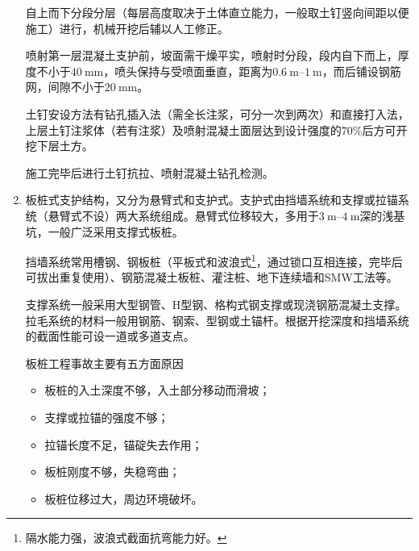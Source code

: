 \documentclass{book}
\begin{document}
\begin{enumerate}
\begin{figure*}[htbp]
\begin{center}
              \end{center}
          \end{figure*}
          \par 自上而下分段分层（每层高度取决于土体直立能力，一般取土钉竖向间距以便施工）进行，机械开挖后辅以人工修正。
          \par 喷射第一层混凝土支护前，坡面需干燥平实，喷射时分段，段内自下而上，厚度不小于$\SI{40}{\mm}$，喷头保持与受喷面垂直，距离为$\SIrange{0.6}{1}{\m}$，而后铺设钢筋网，间隙不小于$\SI{20}{\mm}$。
          \par 土钉安设方法有钻孔插入法（需全长注浆，可分一次到两次）和直接打入法，上层土钉注浆体（若有注浆）及喷射混凝土面层达到设计强度的$70\%$后方可开挖下层土方。
          \par 施工完毕后进行土钉抗拉、喷射混凝土钻孔检测。
    \item 板桩式支护结构，又分为悬臂式和支护式。支护式由挡墙系统和支撑或拉锚系统（悬臂式不设）两大系统组成。悬臂式位移较大，多用于$\SIrange{3}{4}{\m}$深的浅基坑，一般广泛采用支撑式板桩。
          \par 挡墙系统常用槽钢、钢板桩（平板式和波浪式\footnote{隔水能力强，波浪式截面抗弯能力好。}，通过锁口互相连接，完毕后可拔出重复使用）、钢筋混凝土板桩、灌注桩、地下连续墙和SMW工法等。
          \par 支撑系统一般采用大型钢管、H型钢、格构式钢支撑或现浇钢筋混凝土支撑。拉毛系统的材料一般用钢筋、钢索、型钢或土锚杆。根据开挖深度和挡墙系统的截面性能可设一道或多道支点。
          \par 板桩工程事故主要有五方面原因
          \begin{itemize}
              \item 板桩的入土深度不够，入土部分移动而滑坡；
              \item 支撑或拉锚的强度不够；
              \item 拉锚长度不足，锚碇失去作用；
              \item 板桩刚度不够，失稳弯曲；
              \item 板桩位移过大，周边环境破坏。
          \end{itemize}

\end{enumerate}
\end{document}
